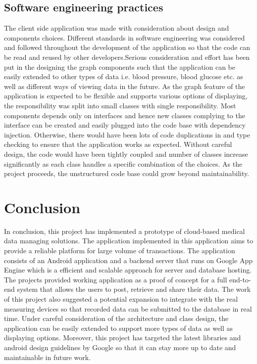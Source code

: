 \subsection{Software engineering practices}
The client side application was made with consideration about design and components choices. Different standards in
software engineering was considered and followed throughout the development of the application so that the code can be
read and reused by other developers.Serious consideration and effort has been put in the designing the graph components
such that the application can be easily extended to other types of data i.e. blood pressure, blood glucose etc. as well
as different ways of viewing data in the future. As the graph feature of the application is expected to be flexible and
supports various options of displaying, the responsibility was split into small classes with single responsibility.
Most components depends only on interfaces and hence new classes complying to the interface can be created and easily
plugged into the code base with dependency injection. Otherwise, there would have been lots of code duplications in and
type checking to ensure that the application works as expected. Without careful design, the code would have been tightly
coupled and number of classes increase significantly as each class handles a specific combination of the choices. As the
project proceeds, the unstructured code base could grow beyond maintainability.

\section{Conclusion}
In conclusion, this project has implemented a prototype of cloud-based medical data managing solutions. The application
implemented in this application aims to provide a reliable platform for large volume of transactions. The application
consists of an Android application and a backend server that runs on Google App Engine which is a efficient and scalable
approach for server and database hosting. The projects provided working application as a proof of concept for a full
end-to-end system that allows the users to post, retrieve and share their data. The work of this project also suggested
a potential expansion to integrate with the real measuring devices so that recorded data can be submitted to the
database in real time. Under careful consideration of the architecture and class design, the application can be easily
extended to support more types of data as well as displaying options. Moreover, this project has targeted the latest
libraries and android design guidelines by Google so that it can stay more up to date and maintainable in future work.
\vfill

 


